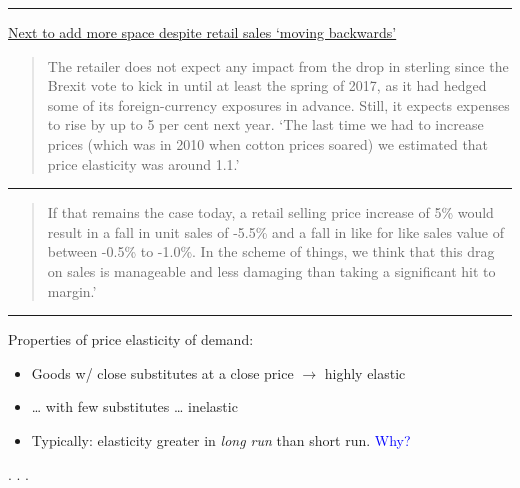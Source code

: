 \documentclass[]{article}
\providecommand{\tightlist}{%
  \setlength{\itemsep}{0pt}\setlength{\parskip}{0pt}}
\begin{document}
\begin{center}\rule{0.5\linewidth}{\linethickness}\end{center}

\href{https://www.ft.com/content/932927d8-266c-3559-b87a-8d3efb07d5e1}{Next
to add more space despite retail sales `moving backwards'}

\begin{quote}
The retailer does not expect any impact from the drop in sterling since
the Brexit vote to kick in until at least the spring of 2017, as it had
hedged some of its foreign-currency exposures in advance. Still, it
expects expenses to rise by up to 5 per cent next year. `The last time
we had to increase prices (which was in 2010 when cotton prices soared)
we estimated that price elasticity was around 1.1.'
\end{quote}

\begin{center}\rule{0.5\linewidth}{\linethickness}\end{center}

\begin{quote}
If that remains the case today, a retail selling price increase of 5\%
would result in a fall in unit sales of -5.5\% and a fall in like for
like sales value of between -0.5\% to -1.0\%. In the scheme of things,
we think that this drag on sales is manageable and less damaging than
taking a significant hit to margin.'
\end{quote}

\begin{center}\rule{0.5\linewidth}{\linethickness}\end{center}

Properties of price elasticity of demand:

\begin{itemize}
\tightlist
\item
  Goods w/ close substitutes at a close price \(\rightarrow\) highly
  elastic
\item
  \ldots{} with few substitutes \ldots{} inelastic
\item
  Typically: elasticity greater in \emph{long run} than short run.
  \textcolor{blue}{Why?}
\end{itemize}


. . .
\end{document}
